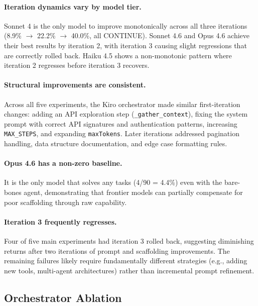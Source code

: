 \documentclass[11pt,a4paper]{article}
\begin{document}
\paragraph{Iteration dynamics vary by model tier.} Sonnet 4 is the only model to improve monotonically across all three iterations (8.9\% $\rightarrow$ 22.2\% $\rightarrow$ 40.0\%, all CONTINUE). Sonnet 4.6 and Opus 4.6 achieve their best results by iteration 2, with iteration 3 causing slight regressions that are correctly rolled back. Haiku 4.5 shows a non-monotonic pattern where iteration 2 regresses before iteration 3 recovers.

\paragraph{Structural improvements are consistent.} Across all five experiments, the Kiro orchestrator made similar first-iteration changes: adding an API exploration step (\texttt{\_gather\_context}), fixing the system prompt with correct API signatures and authentication patterns, increasing \texttt{MAX\_STEPS}, and expanding \texttt{maxTokens}. Later iterations addressed pagination handling, data structure documentation, and edge case formatting rules.

\paragraph{Opus 4.6 has a non-zero baseline.} It is the only model that solves any tasks (4/90 = 4.4\%) even with the bare-bones agent, demonstrating that frontier models can partially compensate for poor scaffolding through raw capability.

\paragraph{Iteration 3 frequently regresses.} Four of five main experiments had iteration 3 rolled back, suggesting diminishing returns after two iterations of prompt and scaffolding improvements. The remaining failures likely require fundamentally different strategies (e.g., adding new tools, multi-agent architectures) rather than incremental prompt refinement.

\subsection{Orchestrator Ablation}
\end{document}
